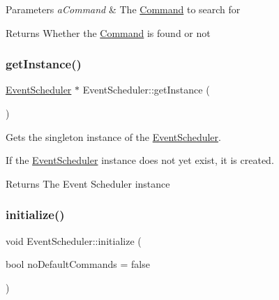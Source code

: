 \begin{DoxyParams}{Parameters}
{\em a\+Command} & The \mbox{\hyperlink{classlib_iterative_robot_1_1_command}{Command}} to search for \\
\hline
\end{DoxyParams}
\begin{DoxyReturn}{Returns}
Whether the \mbox{\hyperlink{classlib_iterative_robot_1_1_command}{Command}} is found or not 
\end{DoxyReturn}
\mbox{\label{classlib_iterative_robot_1_1_event_scheduler_a04480f5533265708f49b23e622ffe9cb}} 
\subsubsection{\texorpdfstring{getInstance()}{getInstance()}}
{\footnotesize\ttfamily \mbox{\hyperlink{classlib_iterative_robot_1_1_event_scheduler}{Event\+Scheduler}} $\ast$ Event\+Scheduler\+::get\+Instance (\begin{DoxyParamCaption}{ }\end{DoxyParamCaption})\hspace{0.3cm}{\ttfamily [static]}}



Gets the singleton instance of the \mbox{\hyperlink{classlib_iterative_robot_1_1_event_scheduler}{Event\+Scheduler}}. 

If the \mbox{\hyperlink{classlib_iterative_robot_1_1_event_scheduler}{Event\+Scheduler}} instance does not yet exist, it is created.

\begin{DoxyReturn}{Returns}
The Event Scheduler instance 
\end{DoxyReturn}
\mbox{\label{classlib_iterative_robot_1_1_event_scheduler_ad67e946fc54ad0a755a36ed5b87279b4}} 
\subsubsection{\texorpdfstring{initialize()}{initialize()}}
{\footnotesize\ttfamily void Event\+Scheduler\+::initialize (\begin{DoxyParamCaption}\item[{bool}]{no\+Default\+Commands = {\ttfamily false} }\end{DoxyParamCaption})}



